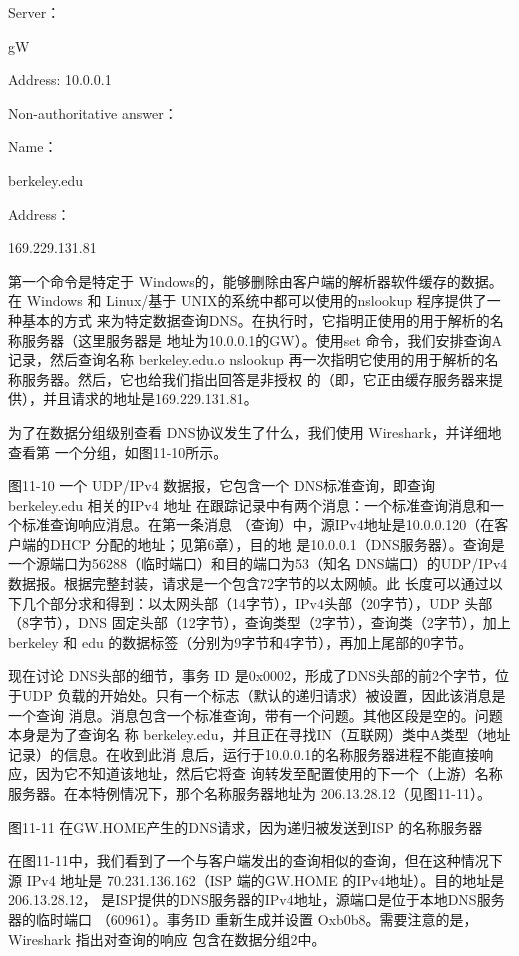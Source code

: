 Server：

gW

Address: 10.0.0.1

Non-authoritative answer：

Name：

berkeley.edu

Address：

169.229.131.81

第一个命令是特定于 Windows的，能够删除由客户端的解析器软件缓存的数据。在
Windows 和 Linux/基于 UNIX的系统中都可以使用的nslookup 程序提供了一种基本的方式
来为特定数据查询DNS。在执行时，它指明正使用的用于解析的名称服务器（这里服务器是
地址为10.0.0.1的GW）。使用set 命令，我们安排查询A记录，然后查询名称 berkeley.edu.o
nslookup 再一次指明它使用的用于解析的名称服务器。然后，它也给我们指出回答是非授权
的（即，它正由缓存服务器来提供），并且请求的地址是169.229.131.81。

为了在数据分组级别查看 DNS协议发生了什么，我们使用 Wireshark，并详细地查看第
一个分组，如图11-10所示。

图11-10
一个 UDP/IPv4 数据报，它包含一个 DNS标准查询，即查询 berkeley.edu 相关的IPv4 地址
在跟踪记录中有两个消息：一个标准查询消息和一个标准查询响应消息。在第一条消息
（查询）中，源IPv4地址是10.0.0.120（在客户端的DHCP 分配的地址；见第6章），目的地
是10.0.0.1（DNS服务器）。查询是一个源端口为56288（临时端口）和目的端口为53（知名
DNS端口）的UDP/IPv4数据报。根据完整封装，请求是一个包含72字节的以太网帧。此
长度可以通过以下几个部分求和得到：以太网头部（14字节），IPv4头部（20字节），UDP
头部（8字节），DNS 固定头部（12字节），查询类型（2字节），查询类（2字节），加上
berkeley 和 edu 的数据标签（分别为9字节和4字节），再加上尾部的0字节。

现在讨论 DNS头部的细节，事务 ID 是0x0002，形成了DNS头部的前2个字节，位
于UDP 负载的开始处。只有一个标志（默认的递归请求）被设置，因此该消息是一个查询
消息。消息包含一个标准查询，带有一个问题。其他区段是空的。问题本身是为了查询名
称 berkeley.edu，并且正在寻找IN（互联网）类中A类型（地址记录）的信息。在收到此消
息后，运行于10.0.0.1的名称服务器进程不能直接响应，因为它不知道该地址，然后它将查
询转发至配置使用的下一个（上游）名称服务器。在本特例情况下，那个名称服务器地址为
206.13.28.12（见图11-11）。

图11-11
在GW.HOME产生的DNS请求，因为递归被发送到ISP 的名称服务器

在图11-11中，我们看到了一个与客户端发出的查询相似的查询，但在这种情况下源
IPv4 地址是 70.231.136.162（ISP 端的GW.HOME 的IPv4地址）。目的地址是206.13.28.12，
是ISP提供的DNS服务器的IPv4地址，源端口是位于本地DNS服务器的临时端口
（60961）。事务ID 重新生成并设置 Oxb0b8。需要注意的是，Wireshark 指出对查询的响应
包含在数据分组2中。

